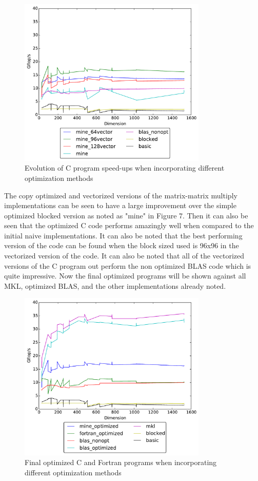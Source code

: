 \documentclass{article}
\begin{document}
\begin{figure}[H]
  \centering
    \includegraphics[width=0.8\textwidth]{cevolution}
    \caption{Evolution of C program speed-ups when incorporating different optimization methods}
\end{figure}

\noindent The copy optimized and vectorized versions of the matrix-matrix multiply implementations can be seen to have a large improvement over the simple optimized blocked version as noted as "mine" in Figure 7. Then it can also be seen that the optimized C code performs amazingly well when compared to the initial naive implementations. It can also be noted that the best performing version of the code can be found when the block sized used is 96x96 in the vectorized version of the code. It can also be noted that all of the vectorized versions of the C program out perform the non optimized BLAS code which is quite impressive. Now the final optimized programs will be shown against all MKL, optimized BLAS, and the other implementations already noted.

\begin{figure}[H]
  \centering
    \includegraphics[width=0.8\textwidth]{timing-optimized}
    \caption{Final optimized C and Fortran programs when incorporating different optimization methods}
\end{figure}
\end{document}
